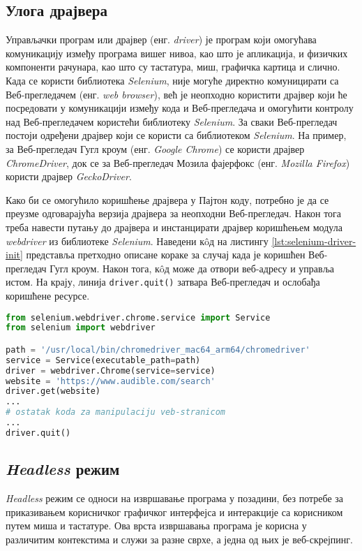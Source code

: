 \documentclass[12pt,oneside]{memoir}
\begin{document}
\subsection{Улога драјвера}
Управљачки програм или драјвер (енг. \textit{driver}) је програм који омогућава комуникацију између програма вишег нивоа, као што је апликација, и физичких компоненти рачунара, као што су тастатура, миш, графичка картица и слично. Када се користи библиотека \textit{Selenium}, није могуће директно комуницирати са Веб-прегледачем (енг. \textit{web browser}), већ је неопходно користити драјвер који ће посредовати у комуникацији између кода и Веб-прегледача и омогућити контролу над Веб-прегледачем користећи библиотеку \textit{Selenium}. За сваки Веб-прегледач постоји одређени драјвер који се користи са библиотеком \textit{Selenium}. На пример, за Веб-прегледач Гугл кроум (енг. \textit{Google Chrome}) се користи драјвер \textit{ChromeDriver}, док се за Веб-прегледач Мозила фајерфокс (енг. \textit{Mozilla Firefox}) користи драјвер \textit{GeckoDriver}.

Како би се омогућило коришћење драјвера у Пајтон коду, потребно је да се преузме одговарајућа верзија драјвера за неопходни Веб-прегледач. Након тога треба навести путању до драјвера и инстанцирати драјвер коришћењем модула \textit{webdriver} из библиотеке \textit{Selenium}. Наведени кôд на листингу \ref{lst:selenium-driver-init} представља претходно описане кораке за случај када је коришћен Веб-прегледач Гугл кроум. Након тога, кôд може да отвори веб-адресу и управља истом. На крају, линија \texttt{driver.quit()} затвара Веб-прегледач и ослобађа коришћене ресурсе.

\begin{lstlisting}[language=Python, caption={Прикупљање \textit{HTML} кода веб-странице помоћу библиотеке \textit{Selenium}}, label={lst:selenium-driver-init}]
from selenium.webdriver.chrome.service import Service
from selenium import webdriver

path = '/usr/local/bin/chromedriver_mac64_arm64/chromedriver'
service = Service(executable_path=path)
driver = webdriver.Chrome(service=service)
website = 'https://www.audible.com/search'
driver.get(website)
...
# ostatak koda za manipulaciju veb-stranicom
...
driver.quit() 
\end{lstlisting}

\subsection{\textit{Headless} режим}
\textit{Headless} режим се односи на извршавање програма у позадини, без потребе за приказивањем корисничког графичког интерфејса и интеракције са корисником путем миша и тастатуре. Ова врста извршавања програма је корисна у различитим контекстима и служи за разне сврхе, а једна од њих је веб-скрејпинг. 
\end{document}
